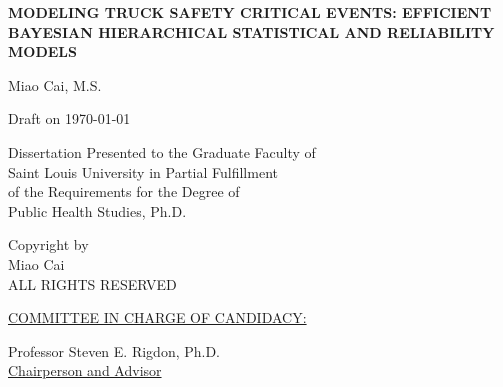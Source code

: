 \documentclass[12pt]{book}
\numberwithin{equation}{chapter}
\newenvironment{bottompar}{\par\vspace*{\fill}}{\clearpage}%
\begin{document}
\begin{titlepage}
\vspace{1cm}
\begin{center}
\linespread{2}\normalsize \bfseries \MakeUppercase{Modeling Truck Safety Critical Events: Efficient Bayesian Hierarchical Statistical and Reliability Models}
\end{center}

\vspace{7cm}

\begin{center}
{Miao Cai,  M.S.}
\vspace{0.3cm}

Draft on \today

\vspace{9cm}

Dissertation Presented to the Graduate Faculty of \\
Saint Louis University in Partial Fulfillment \\
of the Requirements for the Degree of\\
Public Health Studies, Ph.D.\\
\vspace{.5cm}
\the\year
\end{center}

\end{titlepage}


\cleardoublepage
{}
\begin{bottompar}
\begin{center}
\textcopyright \xspace Copyright by\\
Miao Cai \\
ALL RIGHTS RESERVED\\
\vspace{.5cm}
\the\year
\end{center}
\end{bottompar}


\cleardoublepage
{}
\vspace*{\fill}
\underline{COMMITTEE IN CHARGE OF CANDIDACY:}

\vspace{.3cm}
Professor Steven E. Rigdon, Ph.D.\\
{\setlength{\parindent}{20ex}  \indent \underline{Chairperson and Advisor}}
\end{document}

